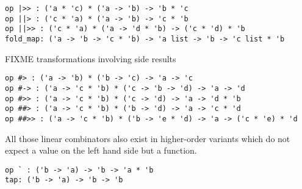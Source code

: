 \begin{isabellebody}
\begin{isamarkuptext}
\begin{mldecls}
  \verb|op |\verb,|,\verb|>> : ('a * 'c) * ('a -> 'b) -> 'b * 'c| \\
  \verb|op |\verb,|,\verb||\verb,|,\verb|> : ('c * 'a) * ('a -> 'b) -> 'c * 'b| \\
  \verb|op |\verb,|,\verb||\verb,|,\verb|>> : ('c * 'a) * ('a -> 'd * 'b) -> ('c * 'd) * 'b| \\
  \verb|fold_map: ('a -> 'b -> 'c * 'b) -> 'a list -> 'b -> 'c list * 'b| \\
  \end{mldecls}%
\end{isamarkuptext}%
\isamarkuptrue%
%
\endisatagmlref
{\isafoldmlref}%
%
\isadelimmlref
%
\endisadelimmlref
%
\begin{isamarkuptext}%
\noindent FIXME transformations involving side results%
\end{isamarkuptext}%
\isamarkuptrue%
%
\isadelimmlref
%
\endisadelimmlref
%
\isatagmlref
%
\begin{isamarkuptext}%
\begin{mldecls}
  \verb|op #> : ('a -> 'b) * ('b -> 'c) -> 'a -> 'c| \\
  \verb|op #-> : ('a -> 'c * 'b) * ('c -> 'b -> 'd) -> 'a -> 'd| \\
  \verb|op #>> : ('a -> 'c * 'b) * ('c -> 'd) -> 'a -> 'd * 'b| \\
  \verb|op ##> : ('a -> 'c * 'b) * ('b -> 'd) -> 'a -> 'c * 'd| \\
  \verb|op ##>> : ('a -> 'c * 'b) * ('b -> 'e * 'd) -> 'a -> ('c * 'e) * 'd| \\
  \end{mldecls}%
\end{isamarkuptext}%
\isamarkuptrue%
%
\endisatagmlref
{\isafoldmlref}%
%
\isadelimmlref
%
\endisadelimmlref
%
\begin{isamarkuptext}%
\noindent All those linear combinators also exist in higher-order
  variants which do not expect a value on the left hand side
  but a function.%
\end{isamarkuptext}%
\isamarkuptrue%
%
\isadelimmlref
%
\endisadelimmlref
%
\isatagmlref
%
\begin{isamarkuptext}%
\begin{mldecls}
  \verb|op ` : ('b -> 'a) -> 'b -> 'a * 'b| \\
  \verb|tap: ('b -> 'a) -> 'b -> 'b| \\

\end{mldecls}
\end{isamarkuptext}
\end{isabellebody}
